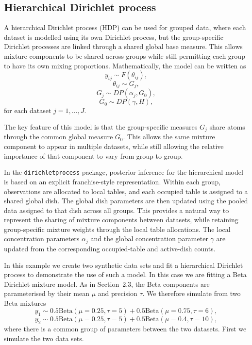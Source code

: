 \documentclass[nojss]{jss}
\begin{document}
\subsection{Hierarchical Dirichlet process}

A hierarchical Dirichlet process (HDP) \citep{teh_sharing_2005} can be used for grouped data,
where each dataset is modelled using its own Dirichlet process, but the group-specific
Dirichlet processes are linked through a shared global base measure. This allows mixture
components to be shared across groups while still permitting each group to have its own
mixing proportions. Mathematically, the model can be written as
\[
y_{ij} \sim F(\theta_{ij}),
\]
\[
\theta_{ij} \sim G_j,
\]
\[
G_j \sim DP(\alpha_j, G_0),
\]
\[
G_0 \sim DP(\gamma, H),
\]
for each dataset $j = 1, \ldots, J$.

The key feature of this model is that the group-specific measures $G_j$ share atoms through
the common global measure $G_0$. This allows the same mixture component to appear in
multiple datasets, while still allowing the relative importance of that component to vary from
group to group.

In the \texttt{dirichletprocess} package, posterior inference for the hierarchical model is
based on an explicit franchise-style representation. Within each group, observations are
allocated to local tables, and each occupied table is assigned to a shared global dish. The
global dish parameters are then updated using the pooled data assigned to that dish across all
groups. This provides a natural way to represent the sharing of mixture components between
datasets, while retaining group-specific mixture weights through the local table allocations.
The local concentration parameters $\alpha_j$ and the global concentration parameter
$\gamma$ are updated from the corresponding occupied-table and active-dish counts.

In this example we create two synthetic data sets and fit a hierarchical Dirichlet process to
demonstrate the use of such a model. In this case we are fitting a Beta Dirichlet mixture model.
As in Section~2.3, the Beta components are parameterised by their mean $\mu$ and precision
$\tau$. We therefore simulate from two Beta mixtures
\[
y_1 \sim 0.5 \text{Beta}(\mu=0.25, \tau=5) + 0.5 \text{Beta}(\mu=0.75, \tau=6),
\]
\[
y_2 \sim 0.5 \text{Beta}(\mu=0.25, \tau=5) + 0.5 \text{Beta}(\mu=0.4, \tau=10),
\]
where there is a common group of parameters between the two datasets. First we simulate
the two data sets.
\end{document}
